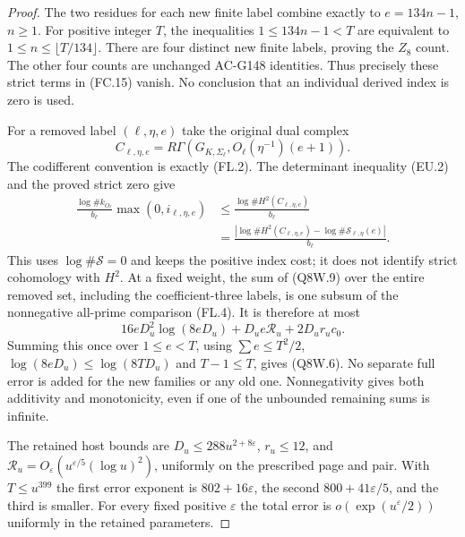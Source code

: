 \begin{proof}
The two residues for each new finite label combine exactly to
$e=134n-1$, $n\geq1$.
For positive integer $T$, the inequalities $1\leq134n-1<T$
are equivalent to $1\leq n\leq\lfloor T/134\rfloor$.
There are four distinct new finite labels, proving the $Z_8$ count.
The other four counts are unchanged AC-G148 identities.
Thus precisely these strict terms in (FC.15) vanish.
No conclusion that an individual derived index is zero is used.

For a removed label $(\ell,\eta,e)$ take the original dual complex
\[
 C_{\ell,\eta,e}=R\Gamma(G_{K,\Sigma_\ell},
                               O_\ell(\eta^{-1})(e+1)).
 \tag{Q8W.8}
\]
The codifferent convention is exactly (FL.2).
The determinant inequality (EU.2) and the proved strict zero give
\[
 \begin{aligned}
 \frac{\log\#k_{O_\ell}}{b_\ell}\max(0,i_{\ell,\eta,e})
 &\leq\frac{\log\#H^2(C_{\ell,\eta,e})}{b_\ell}\\
 &=\frac{\left|\log\#H^2(C_{\ell,\eta,e})
            -\log\#\mathcal S_{\ell,\eta}(e)\right|}{b_\ell}.
 \end{aligned}
 \tag{Q8W.9}
\]
This uses $\log\#\mathcal S=0$ and keeps the positive index cost;
it does not identify strict cohomology with $H^2$.
At a fixed weight, the sum of (Q8W.9) over the entire removed set,
including the coefficient-three labels, is one subsum of the
nonnegative all-prime comparison (FL.4).
It is therefore at most
\[
            16eD_u^2\log(8eD_u)+D_ue\mathcal R_u+2D_ur_uc_0.
 \tag{Q8W.10}
\]
Summing this once over $1\leq e<T$, using
$\sum e\leq T^2/2$, $\log(8eD_u)\leq\log(8TD_u)$ and
$T-1\leq T$, gives (Q8W.6).
No separate full error is added for the new families or any old one.
Nonnegativity gives both additivity and monotonicity, even if
one of the unbounded remaining sums is infinite.

The retained host bounds are $D_u\leq288u^{2+8\varepsilon}$,
$r_u\leq12$, and
$\mathcal R_u=O_\varepsilon(u^{\varepsilon/5}(\log u)^2)$,
uniformly on the prescribed page and pair.
With $T\leq u^{399}$ the first error exponent is
$802+16\varepsilon$, the second $800+41\varepsilon/5$,
and the third is smaller.
For every fixed positive $\varepsilon$ the total error is
$o(\exp(u^\varepsilon/2))$ uniformly in the retained parameters.


\end{proof}

